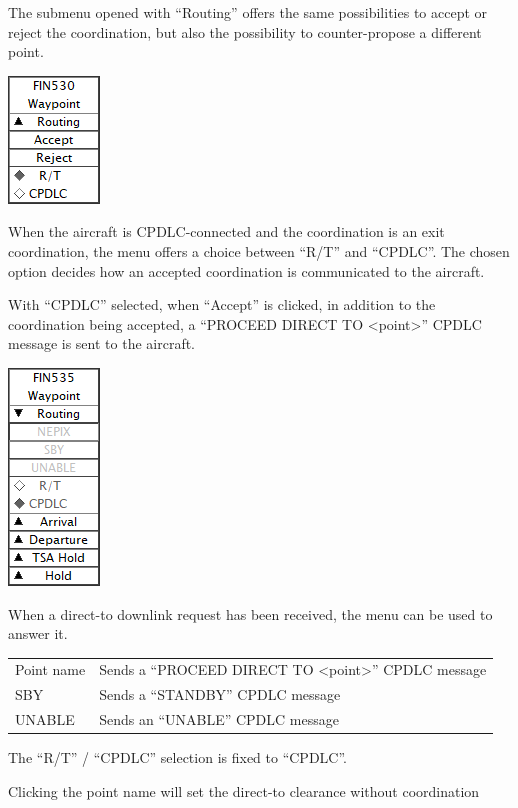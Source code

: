 \documentclass[11pt,a4paper,oldfontcommands]{memoir}
\newenvironment{Warn}
  {\begin{shaded}\marginnote{\fbox{Warning}}}
  {\end{shaded}}
\begin{document}
The submenu opened with “Routing” offers the same possibilities to accept or reject the
coordination, but also the possibility to counter-propose a different point.

\includegraphics{img/wptdl.png}

When the aircraft is CPDLC-connected and the coordination is an exit coordination, the
menu offers a choice between “R/T” and “CPDLC”. The chosen option decides how an
accepted coordination is communicated to the aircraft.

With “CPDLC” selected, when “Accept” is clicked, in addition to the coordination being
accepted, a “PROCEED DIRECT TO <point>” CPDLC message is sent to the aircraft.

\includegraphics{img/wptroute.png}

When a direct-to downlink request has been received, the menu can be used to answer it.

\begin{tabular}{l l}
Point name  & Sends a “PROCEED DIRECT TO <point>” CPDLC message
\\SBY         & Sends a “STANDBY” CPDLC message
\\UNABLE      & Sends an “UNABLE” CPDLC message
\end{tabular}   

The “R/T” / “CPDLC” selection is fixed to “CPDLC”.

\begin{Warn}
Clicking the point name will set the direct-to clearance without coordination
\end{Warn}
\end{document}

